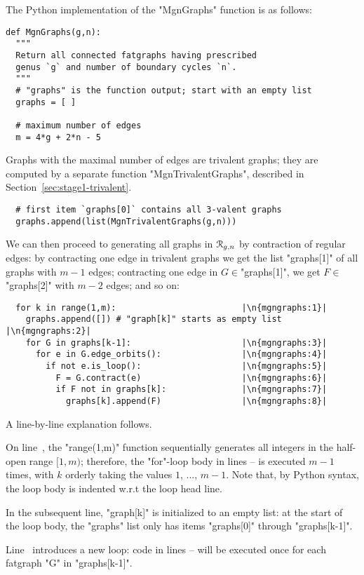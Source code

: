 The Python implementation of the "MgnGraphs" function is as follows:
\begin{lstlisting}
def MgnGraphs(g,n):
  """
  Return all connected fatgraphs having prescribed
  genus `g` and number of boundary cycles `n`.
  """
  # "graphs" is the function output; start with an empty list
  graphs = [ ]

  # maximum number of edges
  m = 4*g + 2*n - 5
\end{lstlisting}
Graphs with the maximal number of edges are trivalent graphs; they are
computed by a separate function "MgnTrivalentGraphs", described in
Section~\ref{sec:stage1-trivalent}.
\begin{lstlisting}
  # first item `graphs[0]` contains all 3-valent graphs
  graphs.append(list(MgnTrivalentGraphs(g,n)))
\end{lstlisting}
We can then proceed to generating all graphs in $\mathcal{R}_{g,n}$ by
contraction of regular edges: by contracting one edge in
trivalent graphs we get the list "graphs[1]" of all graphs with
$m-1$ edges; contracting one edge in $G \in $"graphs[1]", we
get $F \in $"graphs[2]" with $m-2$ edges; and so on:
\begin{lstlisting}
  for k in range(1,m):                         |\n{mgngraphs:1}|
    graphs.append([]) # "graph[k]" starts as empty list |\n{mgngraphs:2}|
    for G in graphs[k-1]:                      |\n{mgngraphs:3}|
      for e in G.edge_orbits():                |\n{mgngraphs:4}|
        if not e.is_loop():                    |\n{mgngraphs:5}|
          F = G.contract(e)                    |\n{mgngraphs:6}|
          if F not in graphs[k]:               |\n{mgngraphs:7}|
            graphs[k].append(F)                |\n{mgngraphs:8}|
\end{lstlisting}
A line-by-line explanation follows.

On line~, the "range(1,m)" function sequentially
generates all integers in the half-open range $[1, m)$; therefore, the
"for"-loop body in lines -- is
executed $m-1$ times, with $k$ orderly taking the values $1$, ...,
$m-1$.  Note that, by Python syntax, the loop body is indented w.r.t
the loop head line.

In the subsequent line, "graph[k]" is initialized to an empty list: at
the start of the loop body, the "graphs" list only has items
"graphs[0]" through "graphs[k-1]".

Line~ introduces a new loop: code in lines
-- will be executed once for each
fatgraph "G" in "graphs[k-1]".

